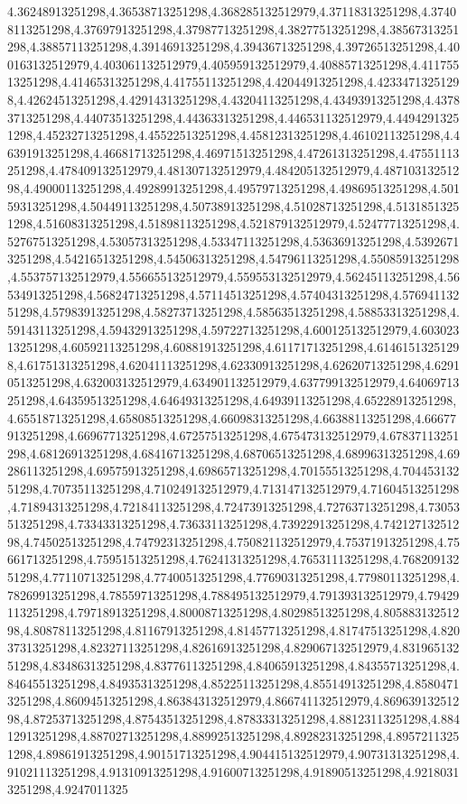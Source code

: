 4.36248913251298,4.36538713251298,4.368285132512979,4.37118313251298,4.37408113251298,4.37697913251298,4.37987713251298,4.38277513251298,4.38567313251298,4.38857113251298,4.39146913251298,4.39436713251298,4.39726513251298,4.400163132512979,4.403061132512979,4.405959132512979,4.40885713251298,4.41175513251298,4.41465313251298,4.41755113251298,4.42044913251298,4.42334713251298,4.42624513251298,4.42914313251298,4.43204113251298,4.43493913251298,4.43783713251298,4.44073513251298,4.44363313251298,4.446531132512979,4.44942913251298,4.45232713251298,4.45522513251298,4.45812313251298,4.46102113251298,4.46391913251298,4.46681713251298,4.46971513251298,4.47261313251298,4.47551113251298,4.478409132512979,4.481307132512979,4.484205132512979,4.48710313251298,4.49000113251298,4.49289913251298,4.49579713251298,4.49869513251298,4.50159313251298,4.50449113251298,4.50738913251298,4.51028713251298,4.51318513251298,4.51608313251298,4.51898113251298,4.521879132512979,4.52477713251298,4.52767513251298,4.53057313251298,4.53347113251298,4.53636913251298,4.53926713251298,4.54216513251298,4.54506313251298,4.54796113251298,4.55085913251298,4.553757132512979,4.556655132512979,4.559553132512979,4.56245113251298,4.56534913251298,4.56824713251298,4.57114513251298,4.57404313251298,4.57694113251298,4.57983913251298,4.58273713251298,4.58563513251298,4.58853313251298,4.59143113251298,4.59432913251298,4.59722713251298,4.600125132512979,4.60302313251298,4.60592113251298,4.60881913251298,4.61171713251298,4.61461513251298,4.61751313251298,4.62041113251298,4.62330913251298,4.62620713251298,4.62910513251298,4.632003132512979,4.634901132512979,4.637799132512979,4.64069713251298,4.64359513251298,4.64649313251298,4.64939113251298,4.65228913251298,4.65518713251298,4.65808513251298,4.66098313251298,4.66388113251298,4.66677913251298,4.66967713251298,4.67257513251298,4.675473132512979,4.67837113251298,4.68126913251298,4.68416713251298,4.68706513251298,4.68996313251298,4.69286113251298,4.69575913251298,4.69865713251298,4.70155513251298,4.70445313251298,4.70735113251298,4.710249132512979,4.713147132512979,4.71604513251298,4.71894313251298,4.72184113251298,4.72473913251298,4.72763713251298,4.73053513251298,4.73343313251298,4.73633113251298,4.73922913251298,4.74212713251298,4.74502513251298,4.74792313251298,4.750821132512979,4.75371913251298,4.75661713251298,4.75951513251298,4.76241313251298,4.76531113251298,4.76820913251298,4.77110713251298,4.77400513251298,4.77690313251298,4.77980113251298,4.78269913251298,4.78559713251298,4.788495132512979,4.791393132512979,4.79429113251298,4.79718913251298,4.80008713251298,4.80298513251298,4.80588313251298,4.80878113251298,4.81167913251298,4.81457713251298,4.81747513251298,4.82037313251298,4.82327113251298,4.82616913251298,4.829067132512979,4.83196513251298,4.83486313251298,4.83776113251298,4.84065913251298,4.84355713251298,4.84645513251298,4.84935313251298,4.85225113251298,4.85514913251298,4.85804713251298,4.86094513251298,4.863843132512979,4.866741132512979,4.86963913251298,4.87253713251298,4.87543513251298,4.87833313251298,4.88123113251298,4.88412913251298,4.88702713251298,4.88992513251298,4.89282313251298,4.89572113251298,4.89861913251298,4.90151713251298,4.904415132512979,4.90731313251298,4.91021113251298,4.91310913251298,4.91600713251298,4.91890513251298,4.92180313251298,4.9247011325